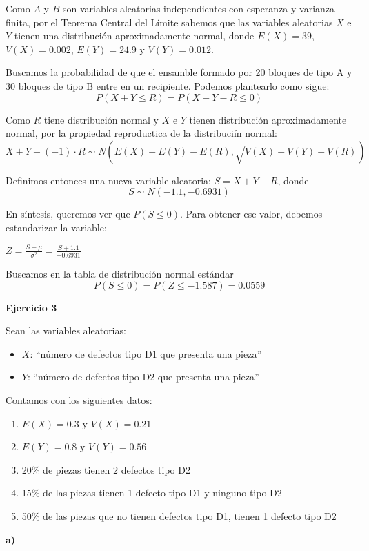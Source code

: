 \documentclass[11pt]{article}
\begin{document}
Como $A$ y $B$ son variables aleatorias independientes con esperanza y varianza finita, por el Teorema Central del L\'imite sabemos que las variables aleatorias $X$ e $Y$ tienen una distribuci\'on aproximadamente normal, donde $E(X) = 39$, $V(X) = 0.002$, $E(Y) = 24.9$ y $V(Y) = 0.012$.

Buscamos la probabilidad de que el ensamble formado por 20 bloques de tipo A y 30 bloques de tipo B entre en un recipiente. Podemos plantearlo como sigue:
$$P(X+Y \leq R) = P(X+Y-R \leq 0)$$

Como $R$ tiene distribuci\'on normal y $X$ e $Y$ tienen distribuci\'on aproximadamente normal, por la propiedad reproductica de la distribuci\'in normal:
$$X + Y + (-1) \cdot R \sim N(E(X)+E(Y)-E(R), \sqrt{V(X)+V(Y)-V(R)})$$

Definimos entonces una nueva variable aleatoria: $S = X+Y-R$, donde
$$S \sim N(-1.1, -0.6931)$$

En s\'intesis, queremos ver que $P(S \leq 0)$. Para obtener ese valor, debemos estandarizar la variable:

$Z = \frac{S - \mu}{\sigma^2} = \frac{S + 1.1}{-0.6931}$

Buscamos en la tabla de distribuci\'on normal est\'andar
$$P(S \leq 0) = P(Z \leq -1.587) = 0.0559$$


\textbf{Ejercicio 3}

Sean las variables aleatorias:
\begin{itemize}
    \item $X$: ``n\'umero de defectos tipo D1 que presenta una pieza''
    \item $Y$: ``n\'umero de defectos tipo D2 que presenta una pieza''
\end{itemize}
Contamos con los siguientes datos:
\begin{enumerate}
    \item $E(X) = 0.3$ y $V(X) = 0.21$
    \item $E(Y) = 0.8$ y $V(Y) = 0.56$
    \item 20\% de piezas tienen 2 defectos tipo D2
    \item 15\% de las piezas tienen 1 defecto tipo D1 y ninguno tipo D2
    \item 50\% de las piezas que no tienen defectos tipo D1, tienen 1 defecto tipo D2
\end{enumerate}

\textbf{a)}
\end{document}
